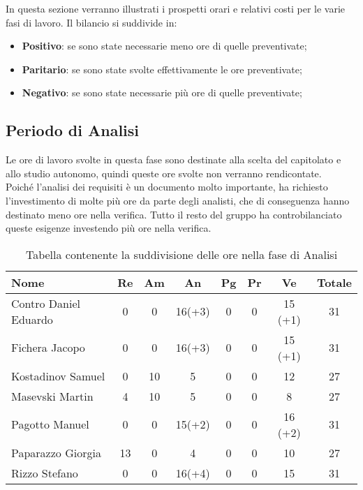 \documentclass[../piano_di_progetto.tex]{subfiles}
\begin{document}
In questa sezione verranno illustrati i prospetti orari e relativi costi per le varie fasi di lavoro. Il bilancio si suddivide in:
\begin{itemize}
\item \textbf{Positivo}: se sono state necessarie meno ore di quelle preventivate;
\item \textbf{Paritario}: se sono state svolte effettivamente le ore preventivate;
\item \textbf{Negativo}: se sono state necessarie più ore di quelle preventivate;
\end{itemize}

\subsection{ Periodo di Analisi}%
\label{sub:cons_analisi}
Le ore di lavoro svolte in questa fase sono destinate alla scelta del capitolato e allo studio autonomo, quindi queste ore svolte non verranno rendicontate.\\
Poiché l'analisi dei requisiti è un documento molto importante, ha richiesto l'investimento di molte più ore da parte degli analisti, che di conseguenza hanno destinato meno ore nella verifica. 
Tutto il resto del gruppo ha controbilanciato queste esigenze investendo più ore nella verifica.

\begin{table}[!ht]
	\centering
	\begin{tabular}{|l|c|c|c|c|c|c|c|}
	\hline
	\rowcolor{lightgray}
	\textbf{Nome} & \textbf{Re} & \textbf{Am} & \textbf{An} & \textbf{Pg}  & \textbf{Pr}   & \textbf{Ve} & \textbf{Totale}\\
	\hline
		Contro Daniel Eduardo & 0 & 0 & 16(+3) & 0 & 0 & 15 (+1) & 31 \\
	\hline
		Fichera Jacopo &        0 & 0 & 16(+3) & 0 & 0 & 15 (+1) & 31 \\
	\hline
		Kostadinov Samuel &     0 & 10 & 5     & 0 & 0 & 12 & 27 \\			
	\hline
		Masevski Martin &       4 & 10 & 5     & 0 & 0 & 8 & 27 \\
	\hline
		Pagotto Manuel &        0 & 0 & 15(+2) & 0 & 0 & 16 (+2) & 31 \\			
	\hline
		Paparazzo Giorgia &     13 & 0 & 4     & 0 & 0 & 10 & 27 \\
	\hline
		Rizzo Stefano &         0 & 0 & 16(+4) & 0 & 0 & 15 & 31 \\
	\hline	
	\end{tabular}
	\caption{Tabella contenente la suddivisione delle ore nella fase di Analisi}
\end{table}
\end{document}
